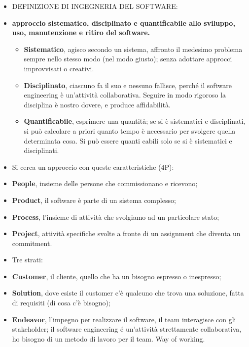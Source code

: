 \documentclass[a4paper,10pt] {article}
\begin{document}
\begin{itemize}
\item DEFINIZIONE DI INGEGNERIA DEL SOFTWARE:

\item \textbf{approccio sistematico, disciplinato e quantificabile allo sviluppo,
uso, manutenzione e ritiro del software.}
	\begin{itemize}
\item \textbf{Sistematico}, agisco secondo un sistema, affronto il medesimo
problema sempre nello stesso modo (nel modo
		giusto); senza adottare approcci improvvisati o creativi.

\item \textbf{Disciplinato}, ciascuno fa il suo e nessuno fallisce, perché il
software engineering è un'attività collaborativa. Seguire in modo
		rigoroso la disciplina è nostro dovere, e  produce affidabilità.

\item \textbf{Quantificabile}, esprimere una quantità; se si è sistematici e
disciplinati, si può calcolare a priori quanto tempo è necessario per
svolgere quella determinata cosa. Si può essere quanti cabili solo se si è
sistematici e disciplinati.
	\end{itemize}

\item Si cerca un approccio con queste caratteristiche (4P):

\item  \textbf{People}, insieme delle persone che commissionano e ricevono;
\item \textbf{Product}, il software è parte di un sistema complesso;
\item \textbf{Process}, l'insieme di attività che svolgiamo ad un particolare
stato;
\item \textbf{Project}, attività specifiche svolte a fronte di un assignment
che diventa un commitment.

\item Tre strati:

\item \textbf{Customer}, il cliente, quello che ha un bisogno espresso o
inespresso;
\item \textbf{Solution}, dove esiste il customer c'è qualcuno che trova una
soluzione, fatta di requisiti (di cosa c'è
bisogno);
\item \textbf{Endeavor}, l'impegno per realizzare il software, il team interagisce
con gli stakeholder; il software engineering é un'attività
strettamente collaborativa, ho bisogno di un metodo di lavoro per il team. Way of
working.


\end{itemize}
\end{document}
